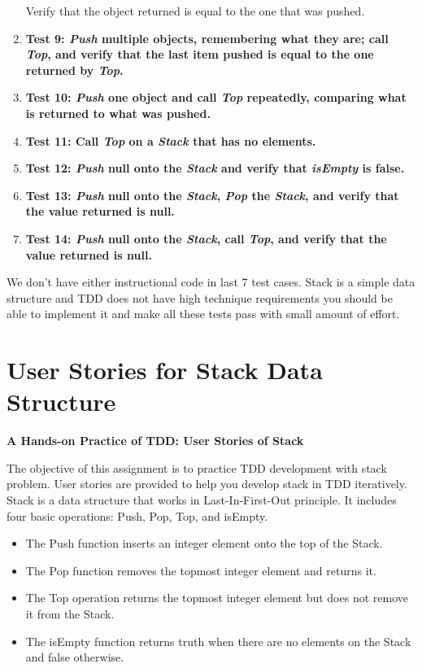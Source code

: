 \begin{enumerate}
Verify that the object returned is equal to the one that was pushed.

\item {\textbf{Test 9: {\em Push} multiple objects, remembering what they are; call {\em Top}, and verify that the last item pushed is equal to the one returned by {\em Top}.}}
\item {\textbf{Test 10: {\em Push} one object and call {\em Top} repeatedly, comparing what is returned to what was pushed.}}
\item {\textbf{Test 11: Call {\em Top} on a {\em Stack} that has no elements.}}
\item {\textbf{Test 12: {\em Push} null onto the {\em Stack} and verify that {\em isEmpty} is false.}}
\item {\textbf{Test 13: {\em Push} null onto the {\em Stack}, {\em Pop} the {\em Stack}, and verify that the value returned is null.}}
\item {\textbf{Test 14: {\em Push} null onto the {\em Stack}, call {\em Top}, and verify that the value returned is null.}}

\end{enumerate}

We don't have either instructional code in last 7 test cases. Stack
is a simple data structure and TDD does not have high technique
requirements you should be able to implement it and make all these
tests pass with small amount of effort.

\chapter{User Stories for Stack Data Structure}
\label{app:UserStoriesStack}

\clearpage
\begin{center}
\LARGE{\textbf{A Hands-on Practice of TDD: User Stories of Stack}}
\end{center}

\noindent The objective of this assignment is to practice TDD development with stack problem. User stories are provided to help you develop stack in TDD iteratively. Stack is a data structure that works in Last-In-First-Out principle. It includes four basic operations: Push, Pop, Top, and isEmpty. 
\begin{itemize}
\item The Push function inserts an integer element onto the top of the Stack.
\item The Pop function removes the topmost integer element and returns it.
\item The Top operation returns the topmost integer element but does not remove it from the Stack.
\item The isEmpty function returns truth when there are no elements on the Stack and false otherwise.
\end{itemize}

